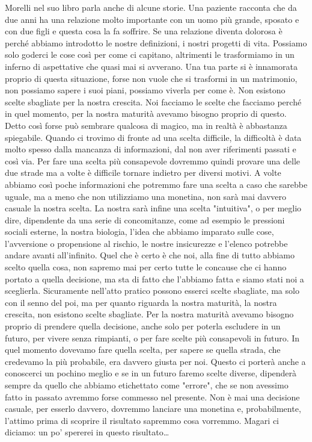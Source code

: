 \documentclass[12pt]{book} %
\begin{document}
Morelli nel suo libro parla anche di alcune storie. Una paziente racconta che da due anni ha una relazione molto
importante con un uomo più grande, sposato e con due figli e questa cosa la fa soffrire. Se una relazione diventa
dolorosa è perché abbiamo introdotto le nostre definizioni, i nostri progetti di vita. Possiamo solo goderci le cose
così per come ci capitano, altrimenti le trasformiamo in un inferno di aspettative che quasi mai si avverano. Una tua
parte si è innamorata proprio di questa situazione, forse non vuole che si trasformi in un matrimonio, non possiamo
sapere i suoi piani, possiamo viverla per come è. Non esistono scelte sbagliate per la nostra crescita. Noi facciamo le
scelte che facciamo perché in quel momento, per la nostra maturità avevamo bisogno proprio di questo. 
Detto così forse può sembrare qualcosa di magico, ma in realtà è abbastanza spiegabile. Quando ci trovimo di fronte ad una scelta difficile, la difficoltà è data molto spesso dalla mancanza di informazioni, dal non aver riferimenti passati e così via. Per fare una scelta più consapevole dovremmo quindi provare una delle due strade ma a volte è difficile tornare indietro per diversi motivi. A volte abbiamo così poche informazioni che potremmo fare una scelta a caso che sarebbe uguale, ma a meno che non utilizziamo una monetina, non sarà mai davvero casuale la nostra scelta. La nostra sarà infine una scelta "intuitiva", o per meglio dire, dipendente da una serie di concomitanze, come ad esempio le pressioni sociali esterne, la nostra biologia, l'idea che abbiamo imparato sulle cose, l'avversione o propensione al rischio, le nostre insicurezze e l'elenco potrebbe andare avanti all'infinito. Quel che è certo è che noi, alla fine di tutto abbiamo scelto quella cosa, non sapremo mai per certo tutte le concause che ci hanno portato a quella decisione, ma sta di fatto che l'abbiamo fatta e siamo stati noi a sceglierla. Sicuramente nell'atto pratico possono esserci scelte sbagliate, ma solo con il senno del poi, ma per quanto riguarda la nostra maturità, la nostra crescita, non esistono scelte sbagliate. Per la nostra maturità avevamo bisogno proprio di prendere quella decisione, anche solo per poterla escludere in un futuro, per vivere senza rimpianti, o per fare scelte più consapevoli in futuro. In quel momento dovevamo fare quella scelta, per sapere se quella strada, che credevamo la più probabile, era davvero giusta per noi. Questo ci porterà anche a conoscerci un pochino meglio e se in un futuro faremo scelte diverse, dipenderà sempre da quello che abbiamo etichettato come "errore", che se non avessimo fatto in passato avremmo forse commesso nel presente. Non è mai una decisione casuale, per esserlo davvero, dovremmo lanciare una monetina e, probabilmente, l'attimo prima di scoprire il risultato sapremmo cosa vorremmo. Magari ci diciamo: un po' spererei in questo risultato… 
\end{document}
